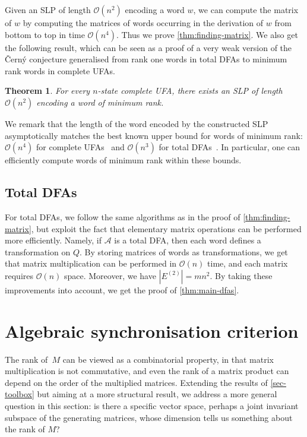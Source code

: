\documentclass[11pt,a4paper]{amsart}
\newcommand{\OO}{\mathcal{O}}
\newcommand{\Aa}{\mathcal{A}}
\theoremstyle{plain}
\newtheorem{thm}{Theorem}[section]
\theoremstyle{definition}
\theoremstyle{defC}
\theoremstyle{thmC}
\theoremstyle{plain}
\numberwithin{equation}{section}
\begin{document}
\noindent
Given an SLP of length $\OO(n^2)$ encoding a word $w$, we can compute the matrix of $w$ by computing the matrices of words occurring in the derivation of $w$ from bottom to top in time $\OO(n^4)$.
Thus we prove \autoref{thm:finding-matrix}. We also get the following result, which can be seen as a proof of a very weak version of the \v{C}ern\'{y} conjecture generalised from rank one words in total DFAs to minimum rank words in complete UFAs.

\begin{thm}
    For every $n$-state complete UFA, there exists an SLP of length $\OO(n^2)$ encoding a word of minimum rank.
\end{thm}

\noindent
We remark that the length of the word encoded by the constructed SLP asymptotically matches the best known upper bound  for words of minimum rank: $\OO(n^4)$ for complete UFAs~\cite{Carpi1988} and $\OO(n^3)$ for total DFAs~\cite{Klyachko1987}. In particular, one can efficiently compute words of minimum rank within these bounds.

\subsection{Total DFAs}\label{subsec-dfas}

For total DFAs, we follow the same algorithms as in the proof of \autoref{thm:finding-matrix}, but exploit the fact that elementary matrix operations can be performed more efficiently. Namely, if $\Aa$ is a total DFA, then each word defines a transformation on $Q$. By storing matrices of words as transformations, we get that matrix multiplication can be performed in $\OO(n)$ time, and each matrix requires $\OO(n)$ space. Moreover, we have $|E^{(2)}| = mn^2$. By taking these improvements into account, we get the proof of \autoref{thm:main-dfas}.




\section{Algebraic synchronisation criterion}\label{sec-algebraic}
The rank of~$M$ can be viewed as a combinatorial property, in that matrix multiplication is not commutative, and even the rank of a matrix product can depend on the order of the multiplied matrices.
Extending the results of \autoref{sec-toolbox} but aiming at a more structural result, we address a more general question in this section: is there a specific vector space, perhaps a joint invariant subspace of the generating matrices, whose dimension tells us something about the rank of $M$? 
\end{document}
